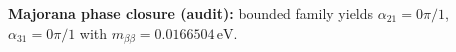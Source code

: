 \textbf{Majorana phase closure (audit):} bounded family yields $\alpha_{21}=0\pi/1$, $\alpha_{31}=0\pi/1$ with $m_{\beta\beta}=0.0166504\,\mathrm{eV}$.